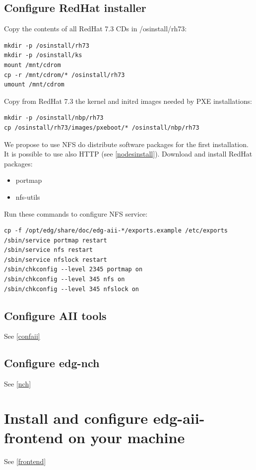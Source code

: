 \documentclass{datagridreport}
\begin{document}
\subsection{Configure RedHat installer} \label{osinstall} %
Copy the contents of all RedHat 7.3 CDs in /osinstall/rh73:
\begin{verbatim}
mkdir -p /osinstall/rh73
mkdir -p /osinstall/ks
mount /mnt/cdrom
cp -r /mnt/cdrom/* /osinstall/rh73
umount /mnt/cdrom
\end{verbatim}
Copy from RedHat 7.3 the kernel and initrd images needed by PXE installations:
\begin{verbatim}
mkdir -p /osinstall/nbp/rh73
cp /osinstall/rh73/images/pxeboot/* /osinstall/nbp/rh73
\end{verbatim}
We propose to use NFS do distribute software packages for the first installation.
It is possible to use also HTTP (see \ref{nodesinstall}). Download and install
RedHat packages:
\begin{itemize}
\item portmap
\item nfs-utils
\end{itemize}
Run these commands to configure NFS service:
\begin{verbatim}
cp -f /opt/edg/share/doc/edg-aii-*/exports.example /etc/exports
/sbin/service portmap restart
/sbin/service nfs restart
/sbin/service nfslock restart
/sbin/chkconfig --level 2345 portmap on
/sbin/chkconfig --level 345 nfs on
/sbin/chkconfig --level 345 nfslock on
\end{verbatim}

\subsection{Configure AII tools}  %
See \ref{confaii}

\subsection{Configure edg-nch} %
See \ref{nch}

\section{Install and configure edg-aii-frontend on your machine}
See \ref{frontend}
\end{document}
